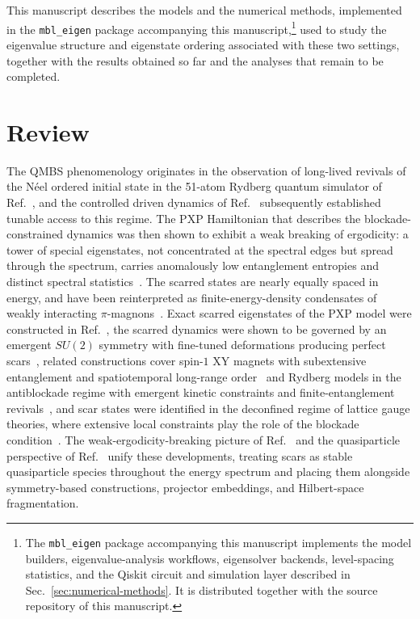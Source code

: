 \documentclass[longbibliography]{revtex4-2}
\begin{document}
This manuscript describes the models and the numerical methods, implemented
in the \texttt{mbl\_eigen} package accompanying this
manuscript,\footnote{The \texttt{mbl\_eigen} package accompanying this
manuscript implements the model builders, eigenvalue-analysis workflows,
eigensolver backends, level-spacing statistics, and the Qiskit circuit and
simulation layer described in Sec.~\ref{sec:numerical-methods}. It is
distributed together with the source repository of this manuscript.} used to
study the eigenvalue structure and eigenstate ordering associated with these
two settings, together with the results obtained so far and the analyses that
remain to be completed.

\section{Review}\label{sec:review}

The QMBS phenomenology originates in the observation of long-lived
revivals of the N\'eel ordered initial state in the 51-atom Rydberg
quantum simulator of Ref.~\cite{bernien2017probing}, and the controlled
driven dynamics of Ref.~\cite{bluvstein2021controlling} subsequently
established tunable access to this regime. The PXP Hamiltonian that
describes the blockade-constrained dynamics was then shown to exhibit a
weak breaking of ergodicity: a tower of special eigenstates, not
concentrated at the spectral edges but spread through the spectrum,
carries anomalously low entanglement entropies and distinct spectral
statistics~\cite{turner2018weak, turner2018quantum}. The scarred states
are nearly equally spaced in energy, and have been reinterpreted as
finite-energy-density condensates of weakly interacting
$\pi$-magnons~\cite{iadecola2019magnon}. Exact scarred eigenstates of
the PXP model were constructed in Ref.~\cite{lin2019exact}, the scarred
dynamics were shown to be governed by an emergent $SU(2)$ symmetry with
fine-tuned deformations producing perfect scars~\cite{choi2019emergent},
related constructions cover spin-$1$ XY magnets with subextensive
entanglement and spatiotemporal long-range order~\cite{schecter2019weak}
and Rydberg models in the antiblockade regime with emergent kinetic
constraints and finite-entanglement revivals~\cite{iadecola2020scar},
and scar states were identified in the deconfined regime of lattice
gauge theories, where extensive local constraints play the role of the
blockade condition~\cite{aramthottil2022scar}. The weak-ergodicity-breaking
picture of Ref.~\cite{serbyn2021quantum} and the quasiparticle perspective
of Ref.~\cite{chandran2023quantum} unify these
developments, treating scars as stable quasiparticle species throughout
the energy spectrum and placing them alongside symmetry-based
constructions, projector embeddings, and Hilbert-space fragmentation.
\end{document}
